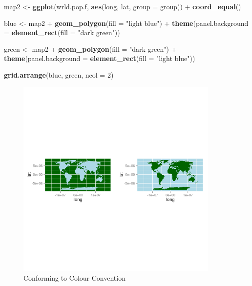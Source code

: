 \documentclass[]{article}
\newenvironment{Shaded}{}{}
\newcommand{\KeywordTok}[1]{\textcolor[rgb]{0.00,0.44,0.13}{\textbf{{#1}}}}
\newcommand{\DataTypeTok}[1]{\textcolor[rgb]{0.56,0.13,0.00}{{#1}}}
\newcommand{\DecValTok}[1]{\textcolor[rgb]{0.25,0.63,0.44}{{#1}}}
\newcommand{\StringTok}[1]{\textcolor[rgb]{0.25,0.44,0.63}{{#1}}}
\newcommand{\NormalTok}[1]{{#1}}
\let\Oldincludegraphics\includegraphics
\renewcommand{\includegraphics}[1]{\Oldincludegraphics[width=10cm]{#1}}
\begin{document}
\begin{Shaded}
\begin{Highlighting}[]
\NormalTok{map2 <- }\KeywordTok{ggplot}\NormalTok{(wrld.pop.f, }\KeywordTok{aes}\NormalTok{(long, lat, }\DataTypeTok{group =} \NormalTok{group)) + }\KeywordTok{coord_equal}\NormalTok{()}

\NormalTok{blue <- map2 + }\KeywordTok{geom_polygon}\NormalTok{(}\DataTypeTok{fill =} \StringTok{"light blue"}\NormalTok{) + }\KeywordTok{theme}\NormalTok{(}\DataTypeTok{panel.background =} \KeywordTok{element_rect}\NormalTok{(}\DataTypeTok{fill =} \StringTok{"dark green"}\NormalTok{))}

\NormalTok{green <- map2 + }\KeywordTok{geom_polygon}\NormalTok{(}\DataTypeTok{fill =} \StringTok{"dark green"}\NormalTok{) + }\KeywordTok{theme}\NormalTok{(}\DataTypeTok{panel.background =} \KeywordTok{element_rect}\NormalTok{(}\DataTypeTok{fill =} \StringTok{"light blue"}\NormalTok{))}

\KeywordTok{grid.arrange}\NormalTok{(blue, green, }\DataTypeTok{ncol =} \DecValTok{2}\NormalTok{)}
\end{Highlighting}
\end{Shaded}
\begin{figure}[htbp]
\centering
\includegraphics{figure/Conforming_to_Colour_Convention.png}
\caption{Conforming to Colour Convention}
\end{figure}
\end{document}
